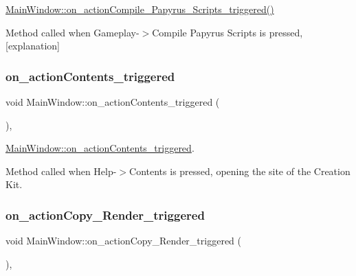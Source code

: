 \hyperlink{class_main_window_aa087e7b86de7eb48d08a7bd160fd70be}{Main\+Window\+::on\+\_\+action\+Compile\+\_\+\+Papyrus\+\_\+\+Scripts\+\_\+triggered()} 

Method called when Gameplay-\/$>$Compile Papyrus Scripts is pressed, \mbox{[}explanation\mbox{]} \mbox{\label{class_main_window_a81fc0d75b7181abbd814b907fa3ba7a4}} 
\subsubsection{\texorpdfstring{on\+\_\+action\+Contents\+\_\+triggered}{on\_actionContents\_triggered}}
{\footnotesize\ttfamily void Main\+Window\+::on\+\_\+action\+Contents\+\_\+triggered (\begin{DoxyParamCaption}{ }\end{DoxyParamCaption})\hspace{0.3cm}{\ttfamily [private]}, {\ttfamily [slot]}}



\hyperlink{class_main_window_a81fc0d75b7181abbd814b907fa3ba7a4}{Main\+Window\+::on\+\_\+action\+Contents\+\_\+triggered}. 

Method called when Help-\/$>$Contents is pressed, opening the site of the Creation Kit. \mbox{\label{class_main_window_a5e9b919e05294457c7ea69f11afa0af8}} 
\subsubsection{\texorpdfstring{on\+\_\+action\+Copy\+\_\+\+Render\+\_\+triggered}{on\_actionCopy\_Render\_triggered}}
{\footnotesize\ttfamily void Main\+Window\+::on\+\_\+action\+Copy\+\_\+\+Render\+\_\+triggered (\begin{DoxyParamCaption}{ }\end{DoxyParamCaption})\hspace{0.3cm}{\ttfamily [private]}, {\ttfamily [slot]}}



